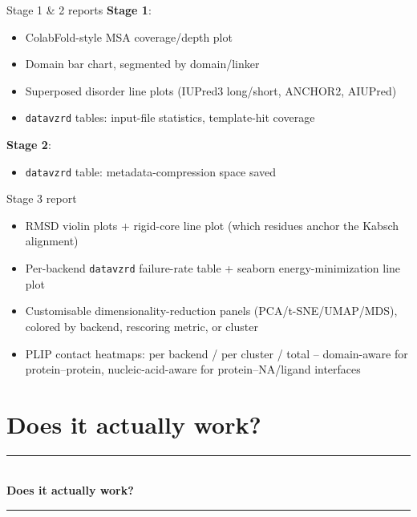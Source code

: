 \documentclass[aspectratio=169]{beamer}
\newcommand{\currentsubsectionname}{}
\newcommand{\sectiondivider}[1]{%
  {\setbeamertemplate{frametitle}{}%
  \begin{frame}
    \vfill
    \begin{center}
      {\color{accent}\rule{0.35\textwidth}{0.6pt}}\\[1.1em]
      {\color{fgtext}\Huge\bfseries #1}\\[1.1em]
      {\color{accent}\rule{0.35\textwidth}{0.6pt}}
    \end{center}
    \vfill
  \end{frame}}%
}
\begin{document}
\begin{frame}{Stage 1 \& 2 reports}
  \footnotesize
  \textbf{Stage 1}:
  \begin{itemize}
    \item ColabFold-style MSA coverage/depth plot
    \item Domain bar chart, segmented by domain/linker
    \item Superposed disorder line plots (IUPred3 long/short, ANCHOR2,
      AIUPred)
    \item \texttt{datavzrd} tables: input-file statistics, template-hit
      coverage
  \end{itemize}
  \vspace{0.6em}
  \textbf{Stage 2}:
  \begin{itemize}
    \item \texttt{datavzrd} table: metadata-compression space saved
  \end{itemize}
\end{frame}

\begin{frame}{Stage 3 report}
  \footnotesize
  \begin{itemize}
    \item RMSD violin plots + rigid-core line plot (which residues anchor
      the Kabsch alignment)
    \item Per-backend \texttt{datavzrd} failure-rate table + seaborn
      energy-minimization line plot
    \item Customisable dimensionality-reduction panels
      (PCA/t-SNE/UMAP/MDS), colored by backend, rescoring metric, or
      cluster
    \item PLIP contact heatmaps: per backend / per cluster / total --
      domain-aware for protein--protein, nucleic-acid-aware for
      protein--NA/ligand interfaces
  \end{itemize}
\end{frame}

\section{Does it actually work?}
\gdef\currentsubsectionname{}
\sectiondivider{Does it actually work?}
\end{document}
